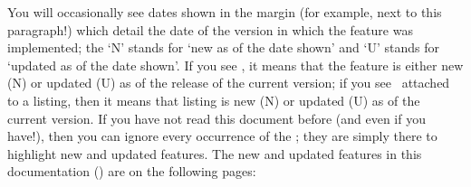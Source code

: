 You will occasionally see dates shown in the margin (for example, next to this
 paragraph!)  which detail the date of the version in
 which the feature was implemented; the `N' stands for `new as of the date shown' and `U'
 stands for `updated as of the date shown'. If you see \stardemo, it means that the
 feature is either new (N) or updated (U) as of the release of the current version; if
 you see \stardemo\, attached to a listing, then it means that listing is new (N) or
 updated (U) as of the current version. If you have not read this document before (and
 even if you have!), then you can ignore every occurrence of the \stardemo; they are
 simply there to highlight new and updated features. The new and updated features in this
 documentation (\gitRel) are on the following pages: \listOfNewFeatures%

